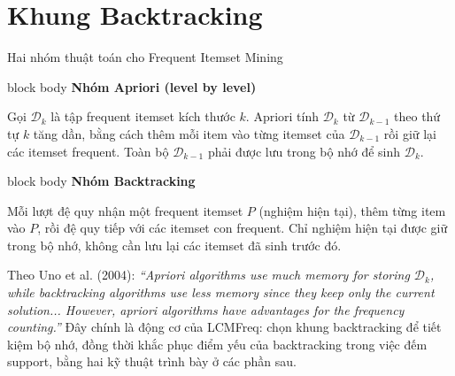 \documentclass[9pt, aspectratio=169]{beamer}
\newenvironment{quietblock}[1]{%
  \begin{beamercolorbox}[wd=\linewidth,sep=5pt,rounded=true]{block body}
  {\color{psdearblue}\bfseries #1}\par\vspace{2pt}\footnotesize
}{%
  \end{beamercolorbox}
}
\begin{document}
\section{Khung Backtracking}
\begin{frame}{Hai nhóm thuật toán cho Frequent Itemset Mining}
  \begin{quietblock}{Nhóm Apriori (level by level)}
    Gọi $\mathcal D_k$ là tập frequent itemset kích thước $k$. Apriori tính
    $\mathcal D_k$ từ $\mathcal D_{k-1}$ theo thứ tự $k$ tăng dần, bằng cách
    thêm mỗi item vào từng itemset của $\mathcal D_{k-1}$ rồi giữ lại các
    itemset frequent. Toàn bộ $\mathcal D_{k-1}$ phải được lưu trong bộ nhớ
    để sinh $\mathcal D_k$.
  \end{quietblock}

  \vspace{0.15cm}
  \begin{quietblock}{Nhóm Backtracking}
    Mỗi lượt đệ quy nhận một frequent itemset $P$ (nghiệm hiện tại), thêm
    từng item vào $P$, rồi đệ quy tiếp với các itemset con frequent. Chỉ
    nghiệm hiện tại được giữ trong bộ nhớ, không cần lưu lại các itemset đã
    sinh trước đó.
  \end{quietblock}

  \vspace{0.2cm}
  \small
  Theo Uno et al. (2004): \textit{``Apriori algorithms use much memory for
  storing $\mathcal D_k$, while backtracking algorithms use less memory
  since they keep only the current solution... However, apriori algorithms
  have advantages for the frequency counting.''} Đây chính là động cơ của
  LCMFreq: chọn khung backtracking để tiết kiệm bộ nhớ, đồng thời khắc phục
  điểm yếu của backtracking trong việc đếm support, bằng hai kỹ thuật trình
  bày ở các phần sau.
\end{frame}
\end{document}
